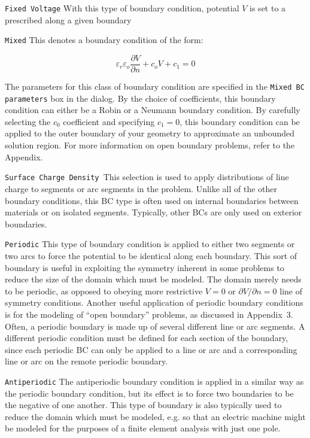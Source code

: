 \documentclass[12pt]{report}
\begin{document}
\texttt{Fixed Voltage} With this type of boundary condition, potential $V$ is
set to a prescribed along a given boundary

\texttt{Mixed} This denotes a boundary condition of the form:

\begin{equation}
\label{eq7}
\varepsilon _r \varepsilon _o \frac{\partial V}{\partial n} + c_o V + c_1 =
0
\end{equation}

The parameters for this class of boundary condition are specified in the
\texttt{Mixed BC parameters} box in the dialog. By the choice of
coefficients, this boundary condition can either be a Robin or a Neumann
boundary condition. By carefully selecting the $c_0 $ coefficient and
specifying $c_1 = 0$, this boundary condition can be applied to the outer
boundary of your geometry to approximate an unbounded solution region. For
more information on open boundary problems, refer to the Appendix.

\texttt{Surface Charge Density }This selection is used to apply
distributions of line charge to segments or arc segments in the problem.
Unlike all of the other boundary conditions, this BC type is often used on
internal boundaries between materials or on isolated segments. Typically,
other BCs are only used on exterior boundaries.

\texttt{Periodic} This type of boundary condition is applied to either two
segments or two arcs to force the potential to be identical along each
boundary. This sort of boundary is useful in exploiting the symmetry
inherent in some problems to reduce the size of the domain which must be
modeled. The domain merely needs to be periodic, as opposed to obeying more
restrictive $V = 0$ or $\partial V / \partial n = 0$ line of symmetry
conditions. Another useful application of periodic boundary conditions is
for the modeling of ``open boundary'' problems, as discussed in Appendix~3.
Often, a periodic boundary is made up of several different line or arc
segments. A different periodic condition must be defined for each section of
the boundary, since each periodic BC can only be applied to a line or arc
and a corresponding line or arc on the remote periodic boundary.

\texttt{Antiperiodic} The antiperiodic boundary condition is
applied in a similar way as the periodic boundary condition, but
its effect is to force two boundaries to be the negative of one
another. This type of boundary is also typically used to reduce the
domain which must be modeled, e.g. so that an electric machine
might be modeled for the purposes of a finite element analysis with
just one pole.
\end{document}
